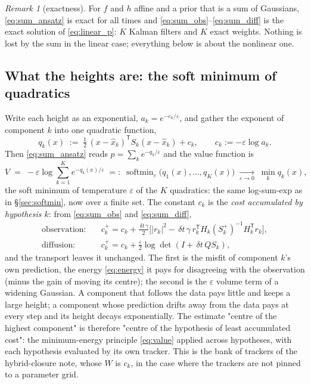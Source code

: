 \documentclass[11pt,a4paper]{article}
\newcommand{\T}{^{\mathsf T}}
\newcommand{\xh}{\hat{x}}
\newcommand{\eps}{\varepsilon}
\newcommand{\abs}[1]{\left\lvert #1 \right\rvert}
\newcommand{\dt}{\,\delta t}
\theoremstyle{plain}
\theoremstyle{definition}
\theoremstyle{remark}
\newtheorem{remark}{Remark}
\begin{document}
\begin{remark}[exactness]
\label{rem:sum_exact}
For $f$ and $h$ affine and a prior that is a sum of Gaussians, \eqref{eq:sum_ansatz} is exact for all times and \eqref{eq:sum_obs}--\eqref{eq:sum_diff} is the exact solution of \eqref{eq:linear_p}: $K$ Kalman filters and $K$ exact weights. Nothing is lost by the sum in the linear case; everything below is about the nonlinear one.
\end{remark}

\subsection{What the heights are: the soft minimum of quadratics}

Write each height as an exponential, $a_k=e^{-c_k/\eps}$, and gather the exponent of component $k$ into one quadratic function,
\begin{equation}
  q_k(x) \;:=\; \tfrac12\,(x-\xh_k)\T S_k(x-\xh_k) + c_k, \qquad c_k := -\eps\log a_k .
  \label{eq:sum_quadratic}
\end{equation}
Then \eqref{eq:sum_ansatz} reads $p=\sum_ke^{-q_k/\eps}$ and the value function is
\begin{equation}
  V \;=\; -\eps\log\sum_{k=1}^Ke^{-q_k(x)/\eps} \;=:\; \operatorname{softmin}_\eps\big(q_1(x),\dots,q_K(x)\big)
  \;\xrightarrow[\eps\to0]{}\; \min_kq_k(x) ,
  \label{eq:sum_softmin}
\end{equation}
the soft minimum of temperature $\eps$ of the $K$ quadratics: the same log-sum-exp as in \S\ref{sec:softmin}, now over a finite set. The constant $c_k$ is the \emph{cost accumulated by hypothesis $k$}: from \eqref{eq:sum_obs} and \eqref{eq:sum_diff},
\begin{equation}
\begin{aligned}
  \text{observation:}\quad & c_k^+ = c_k + \frac{\dt\,\gamma}{2}\Big[\abs{r_k}^2 - \dt\,\gamma\,r_k\T H_k(S_k^+)^{-1}H_k\T r_k\Big], \\
  \text{diffusion:}\quad & c_k^+ = c_k + \frac\eps2\log\det(I+\dt\,QS_k),
\end{aligned}
  \label{eq:sum_cost}
\end{equation}
and the transport leaves it unchanged. The first is the misfit of component $k$'s own prediction, the energy \eqref{eq:energy} it pays for disagreeing with the observation (minus the gain of moving its centre); the second is the $\eps$ volume term of a widening Gaussian. A component that follows the data pays little and keeps a large height; a component whose prediction drifts away from the data pays at every step and its height decays exponentially. The estimate "centre of the highest component" is therefore "centre of the hypothesis of least accumulated cost": the minimum-energy principle \eqref{eq:value} applied across hypotheses, with each hypothesis evaluated by its own tracker. This is the bank of trackers of the hybrid-closure note, whose $W$ is $c_k$, in the case where the trackers are not pinned to a parameter grid.
\end{document}

